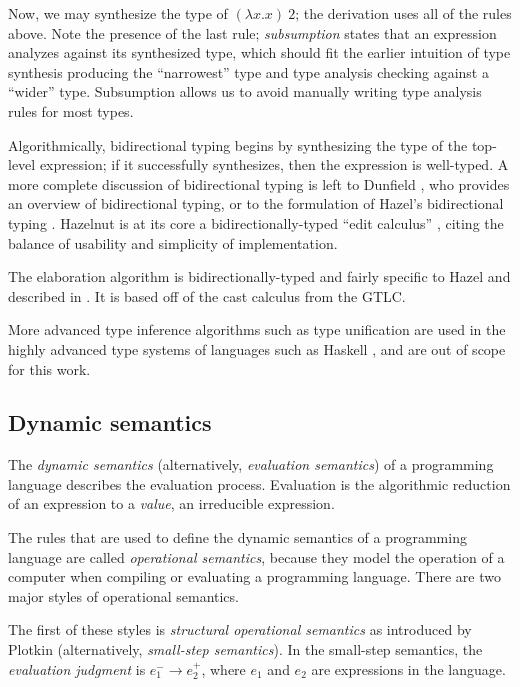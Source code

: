 Now, we may synthesize the type of $(\lambda x.x)\ 2$; the derivation uses all of the rules above. Note the presence of the last rule; \textit{subsumption} states that an expression analyzes against its synthesized type, which should fit the earlier intuition of type synthesis producing the ``narrowest'' type and type analysis checking against a ``wider'' type. Subsumption allows us to avoid manually writing type analysis rules for most types.

Algorithmically, bidirectional typing begins by synthesizing the type of the top-level expression; if it successfully synthesizes, then the expression is well-typed. A more complete discussion of bidirectional typing is left to Dunfield \cite{Dunfield_2022}, who provides an overview of bidirectional typing, or to the formulation of Hazel's bidirectional typing \cite{conf/popl/Hazelnut17}. Hazelnut is at its core a bidirectionally-typed ``edit calculus'' \cite{conf/popl/Hazelnut17}, citing the balance of usability and simplicity of implementation.

The elaboration algorithm is bidirectionally-typed and fairly specific to Hazel and described in . It is based off of the cast calculus from the GTLC.

More advanced type inference algorithms such as type unification are used in the highly advanced type systems of languages such as Haskell \cite{gundry2013type}, and are out of scope for this work.

\subsection{Dynamic semantics}
\label{sec:dynamic-semantics}

The \textit{dynamic semantics} (alternatively, \textit{evaluation semantics}) of a programming language describes the evaluation process. Evaluation is the algorithmic reduction of an expression to a \textit{value}, an irreducible expression.

The rules that are used to define the dynamic semantics of a programming language are called \textit{operational semantics}, because they model the operation of a computer when compiling or evaluating a programming language. There are two major styles of operational semantics.

The first of these styles is \textit{structural operational semantics} as introduced by Plotkin \cite{plotkin1981structural} (alternatively, \textit{small-step semantics}). In the small-step semantics, the \textit{evaluation judgment} is $e_1^-\to e_2^+$, where $e_1$ and $e_2$ are expressions in the language.

